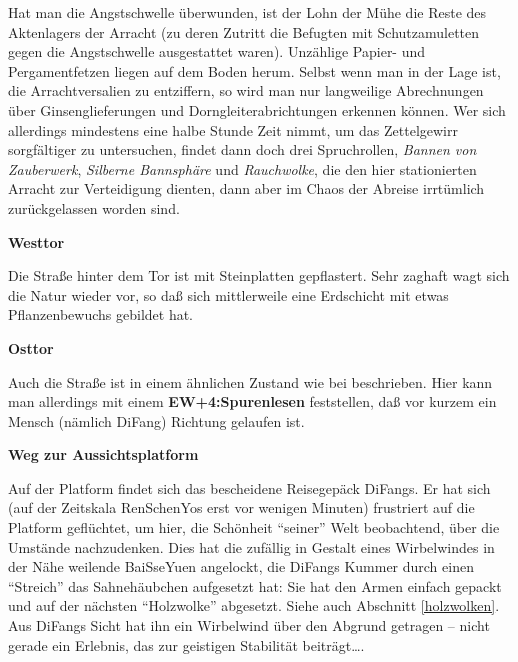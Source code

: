 \documentclass[
a4paper,
twoside,
DIV=calc,
BCOR=4mm,
fontsize=9pt,
twocolumn=on,
titlepage=on,
parskip=half
]{scrartcl}
\begin{document}
Hat man die Angstschwelle überwunden, ist der Lohn der Mühe die Reste
des Aktenlagers der Arracht (zu deren Zutritt die Befugten mit
Schutzamuletten gegen die Angstschwelle ausgestattet waren). Unzählige
Papier- und Pergamentfetzen liegen auf dem Boden herum. Selbst wenn
man in der Lage ist, die Arrachtversalien zu entziffern, so wird man
nur langweilige Abrechnungen über Ginsenglieferungen und
Dorngleiterabrichtungen erkennen können. Wer sich allerdings
mindestens eine halbe Stunde Zeit nimmt, um das Zettelgewirr
sorgfältiger zu untersuchen, findet dann doch drei Spruchrollen,
\emph{Bannen von Zauberwerk}, \emph{Silberne Bannsphäre} und
\emph{Rauchwolke}, die den hier stationierten Arracht zur Verteidigung
dienten, dann aber im Chaos der Abreise irrtümlich zurückgelassen
worden sind.

\textbf{ Westtor}


Die Straße hinter dem Tor ist mit Steinplatten gepflastert. Sehr
zaghaft wagt sich die Natur wieder vor, so daß sich mittlerweile eine
Erdschicht mit etwas Pflanzenbewuchs gebildet hat.

\textbf{ Osttor}


Auch die Straße ist in einem ähnlichen Zustand wie bei 
beschrieben. Hier kann man allerdings mit einem
\textbf{EW+4:Spurenlesen} feststellen, daß vor kurzem ein Mensch
(nämlich DiFang) Richtung  gelaufen ist.

\textbf{ Weg zur Aussichtsplatform}


Auf der Platform findet sich das bescheidene Reisegepäck DiFangs. Er
hat sich (auf der Zeitskala RenSchenYos erst vor wenigen Minuten)
frustriert auf die Platform geflüchtet, um hier, die Schönheit
"`seiner"' Welt beobachtend, über die Umstände nachzudenken. Dies hat
die zufällig in Gestalt eines Wirbelwindes in der Nähe weilende
BaiSseYuen angelockt, die DiFangs Kummer durch einen "`Streich"' das
Sahnehäubchen aufgesetzt hat: Sie hat den Armen einfach gepackt und
auf der nächsten "`Holzwolke"' abgesetzt. Siehe auch Abschnitt
\ref{holzwolken}. Aus DiFangs Sicht hat ihn ein Wirbelwind über den
Abgrund getragen -- nicht gerade ein Erlebnis, das zur geistigen
Stabilität beiträgt\dots.
\end{document}
